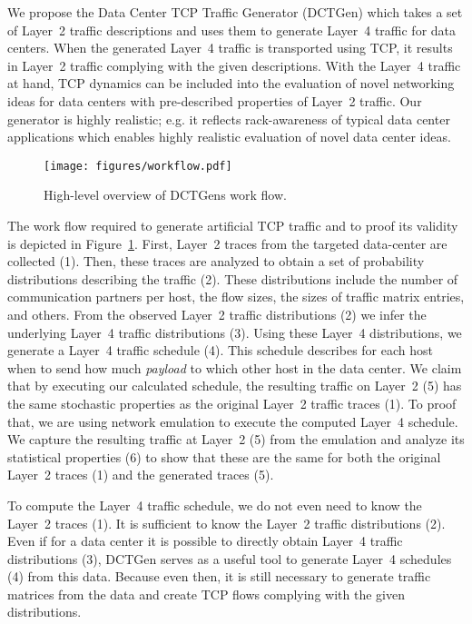 \documentclass[journal,10pt]{IEEEtran}
\newcommand{\genname}{DCTGen}
\newcommand{\lf}{Layer~4}
\begin{document}
We propose 
the Data Center TCP Traffic Generator (\genname{})
which takes a set of Layer~2 traffic descriptions and uses them to generate Layer~4 traffic for data centers.
When the generated Layer~4 traffic is transported using TCP, it results in Layer~2 traffic complying with the given descriptions.
With the Layer~4 traffic at hand, TCP dynamics can be included into the evaluation of novel networking ideas for data centers
with pre-described properties of Layer~2 traffic.
Our generator is highly realistic; e.g. it reflects rack-awareness of typical data center applications
which enables highly realistic evaluation of novel data center ideas.


\begin{figure}
	\centering
	\texttt{[image: figures/workflow.pdf]}
	\caption{High-level overview of \genname{}s work flow.}
	\label{fig:workflow}
\end{figure}


The work flow required to generate artificial TCP traffic and to proof its validity is depicted in Figure~\ref{fig:workflow}.
First, Layer~2 traces from the targeted data-center are collected (1).
Then, these traces are analyzed to
obtain a set of probability distributions describing the traffic (2).
These distributions include the number of communication partners per host, the flow sizes, 
the sizes of traffic matrix entries, and others.
From the observed Layer~2 traffic distributions (2) we infer the underlying Layer~4 traffic distributions (3).
Using these \lf{} distributions, 
we generate a Layer~4 traffic schedule (4). 
This schedule describes for each host when to send how much \emph{payload} to which other host in the data center.
We claim that by executing our calculated schedule, the resulting traffic on Layer~2 (5) has the same stochastic properties as 
the original Layer~2 traffic traces (1).
To proof that, we are using network emulation to execute the computed \lf{} schedule. We capture the resulting traffic at Layer~2 (5) from the emulation and
analyze its statistical properties (6) to show that these are the same for both the original Layer~2 traces (1) and the generated traces (5).

To compute the Layer~4 traffic schedule, we do not even need to know the Layer~2 traces (1). 
It is sufficient to know the Layer~2 traffic distributions (2).
Even if for a data center it is possible to directly obtain \lf{} traffic distributions (3), \genname{} serves as a useful tool to generate
\lf{} schedules (4) from this data. Because even then, it is still necessary to generate traffic matrices from the data and create TCP flows complying with the
given distributions.
\end{document}
